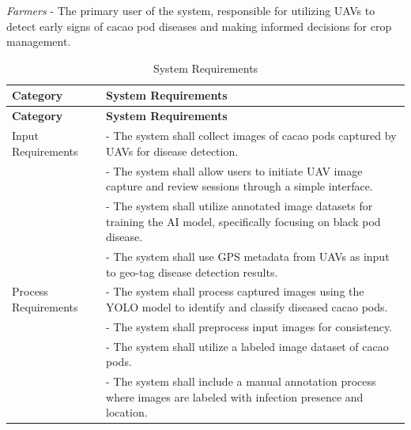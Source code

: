 \textit{Farmers} - The primary user of the system, responsible for utilizing UAVs to detect early signs of cacao pod diseases and making informed decisions for crop management.

\begin{longtable}{p{4cm} p{8cm}}
	\caption{System Requirements} \label{tab:sysreq}                                                                                                                                      \\

	\toprule
	\textbf{Category}        & \textbf{System Requirements}                                                                                                                               \\
	\midrule
	\endfirsthead

	\toprule
	\textbf{Category}        & \textbf{System Requirements}                                                                                                                               \\
	\midrule
	\endhead

	\bottomrule
	\endfoot

	Input Requirements       & - The system shall collect images of cacao pods captured by UAVs for disease detection.                                                                    \\
	                         & - The system shall allow users to initiate UAV image capture and review sessions through a simple interface.                                               \\
	                         & - The system shall utilize annotated image datasets for training the AI model, specifically focusing on black pod disease.                                 \\
	                         & - The system shall use GPS metadata from UAVs as input to geo-tag disease detection results.                                                               \\
	\midrule

	Process Requirements     & - The system shall process captured images using the YOLO model to identify and classify diseased cacao pods.                                              \\
	                         & - The system shall preprocess input images for consistency.                                                                                                \\
	                         & - The system shall utilize a labeled image dataset of cacao pods.                                                                                          \\
	                         & - The system shall include a manual annotation process where images are labeled with infection presence and location.                                      \\
	\midrule


\end{longtable}
